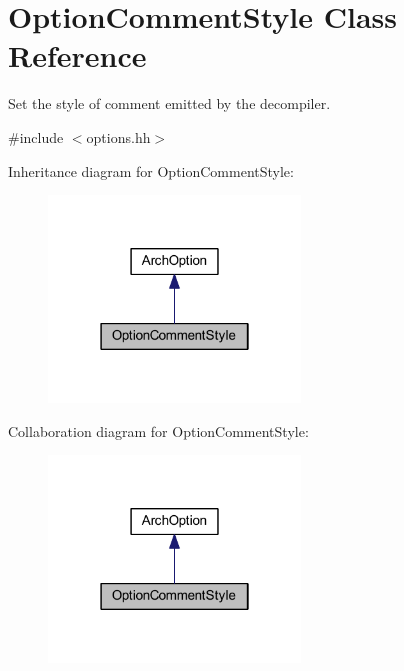 \hypertarget{class_option_comment_style}{}\section{Option\+Comment\+Style Class Reference}
\label{class_option_comment_style}


Set the style of comment emitted by the decompiler.  




{\ttfamily \#include $<$options.\+hh$>$}



Inheritance diagram for Option\+Comment\+Style\+:
\nopagebreak
\begin{figure}[H]
\begin{center}
\leavevmode
\includegraphics[width=190pt]{class_option_comment_style__inherit__graph}
\end{center}
\end{figure}


Collaboration diagram for Option\+Comment\+Style\+:
\nopagebreak
\begin{figure}[H]
\begin{center}
\leavevmode
\includegraphics[width=190pt]{class_option_comment_style__coll__graph}
\end{center}
\end{figure}
